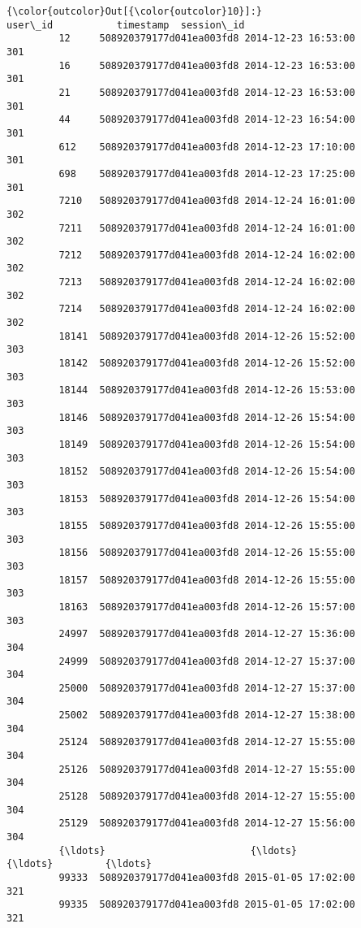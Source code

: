 \documentclass[11pt]{article}
\begin{document}
\begin{Verbatim}[commandchars=\\\{\}]
{\color{outcolor}Out[{\color{outcolor}10}]:}                         user\_id           timestamp  session\_id
         12     508920379177d041ea003fd8 2014-12-23 16:53:00         301
         16     508920379177d041ea003fd8 2014-12-23 16:53:00         301
         21     508920379177d041ea003fd8 2014-12-23 16:53:00         301
         44     508920379177d041ea003fd8 2014-12-23 16:54:00         301
         612    508920379177d041ea003fd8 2014-12-23 17:10:00         301
         698    508920379177d041ea003fd8 2014-12-23 17:25:00         301
         7210   508920379177d041ea003fd8 2014-12-24 16:01:00         302
         7211   508920379177d041ea003fd8 2014-12-24 16:01:00         302
         7212   508920379177d041ea003fd8 2014-12-24 16:02:00         302
         7213   508920379177d041ea003fd8 2014-12-24 16:02:00         302
         7214   508920379177d041ea003fd8 2014-12-24 16:02:00         302
         18141  508920379177d041ea003fd8 2014-12-26 15:52:00         303
         18142  508920379177d041ea003fd8 2014-12-26 15:52:00         303
         18144  508920379177d041ea003fd8 2014-12-26 15:53:00         303
         18146  508920379177d041ea003fd8 2014-12-26 15:54:00         303
         18149  508920379177d041ea003fd8 2014-12-26 15:54:00         303
         18152  508920379177d041ea003fd8 2014-12-26 15:54:00         303
         18153  508920379177d041ea003fd8 2014-12-26 15:54:00         303
         18155  508920379177d041ea003fd8 2014-12-26 15:55:00         303
         18156  508920379177d041ea003fd8 2014-12-26 15:55:00         303
         18157  508920379177d041ea003fd8 2014-12-26 15:55:00         303
         18163  508920379177d041ea003fd8 2014-12-26 15:57:00         303
         24997  508920379177d041ea003fd8 2014-12-27 15:36:00         304
         24999  508920379177d041ea003fd8 2014-12-27 15:37:00         304
         25000  508920379177d041ea003fd8 2014-12-27 15:37:00         304
         25002  508920379177d041ea003fd8 2014-12-27 15:38:00         304
         25124  508920379177d041ea003fd8 2014-12-27 15:55:00         304
         25126  508920379177d041ea003fd8 2014-12-27 15:55:00         304
         25128  508920379177d041ea003fd8 2014-12-27 15:55:00         304
         25129  508920379177d041ea003fd8 2014-12-27 15:56:00         304
         {\ldots}                         {\ldots}                 {\ldots}         {\ldots}
         99333  508920379177d041ea003fd8 2015-01-05 17:02:00         321
         99335  508920379177d041ea003fd8 2015-01-05 17:02:00         321

\end{Verbatim}
\end{document}
